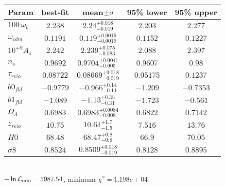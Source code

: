 \begin{tabular}{|l|c|c|c|c|} 
 \hline 
Param & best-fit & mean$\pm\sigma$ & 95\% lower & 95\% upper \\ \hline 
$100~\omega_{b }$ &$2.238$ & $2.24_{-0.019}^{+0.018}$ & $2.203$ & $2.277$ \\ 
$\omega_{cdm }$ &$0.1191$ & $0.119_{-0.0019}^{+0.0019}$ & $0.1152$ & $0.1227$ \\ 
$10^{+9}A_{s }$ &$2.242$ & $2.239_{-0.083}^{+0.075}$ & $2.088$ & $2.397$ \\ 
$n_{s }$ &$0.9692$ & $0.9704_{-0.005}^{+0.0047}$ & $0.9607$ & $0.98$ \\ 
$\tau_{reio }$ &$0.08722$ & $0.08669_{-0.019}^{+0.018}$ & $0.05175$ & $0.1237$ \\ 
$b0_{fld }$ &$-0.9779$ & $-0.966_{-0.11}^{+0.14}$ & $-1.209$ & $-0.7353$ \\ 
$b1_{fld }$ &$-1.089$ & $-1.13_{-0.31}^{+0.35}$ & $-1.723$ & $-0.561$ \\ 
$\Omega_{\Lambda }$ &$0.6983$ & $0.6983_{-0.008}^{+0.0084}$ & $0.6822$ & $0.7142$ \\ 
$z_{reio }$ &$10.75$ & $10.64_{-1.5}^{+1.7}$ & $7.516$ & $13.76$ \\ 
$H0$ &$68.48$ & $68.47_{-0.8}^{+0.8}$ & $66.9$ & $70.05$ \\ 
$\sigma8$ &$0.8524$ & $0.8509_{-0.019}^{+0.018}$ & $0.8128$ & $0.8895$ \\ 
\hline 
 \end{tabular} \\ 
$-\ln{\cal L}_\mathrm{min} =5987.54$, minimum $\chi^2=1.198e+04$ \\ 
